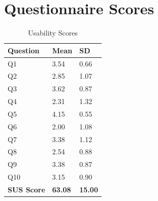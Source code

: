 \chapter{Questionnaire Scores}
\label{appendix:questionnaire_scores}

\begin{table}[ht!]
    \centering
    \footnotesize
    \begin{tabular}{
      |p{}%
      |p{}%
      |p{}|%
      }
      \hline
      \centering Question & \centering Mean & \centering\arraybackslash SD    \\ \hline
      \hfil Q1 & \hfil 3.54 & \hfil 0.66 \\ \hline
      \hfil Q2 & \hfil 2.85 & \hfil 1.07 \\ \hline
      \hfil Q3 & \hfil 3.62 & \hfil 0.87 \\ \hline
      \hfil Q4 & \hfil 2.31 & \hfil 1.32 \\ \hline
      \hfil Q5 & \hfil 4.15 & \hfil 0.55 \\ \hline
      \hfil Q6 & \hfil 2.00 & \hfil 1.08 \\ \hline
      \hfil Q7 & \hfil 3.38 & \hfil 1.12 \\ \hline
      \hfil Q8 & \hfil 2.54 & \hfil 0.88 \\ \hline
      \hfil Q9 & \hfil 3.38 & \hfil 0.87 \\ \hline
      \hfil Q10 & \hfil 3.15 & \hfil 0.90 \\ \hline
      \hfil \textbf{SUS Score} & \hfil \textbf{63.08} & \hfil \textbf{15.00} \\ \hline
    \end{tabular}
    \caption{Usability Scores}
    \label{tab:sus_score}
\end{table}



% 

% 

% 
